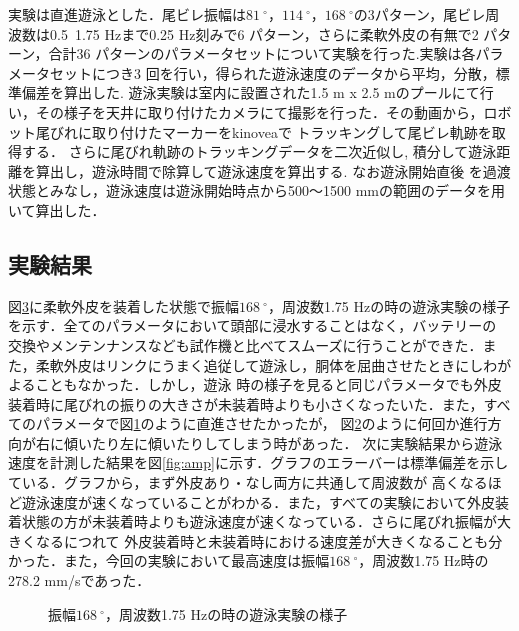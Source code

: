 実験は直進遊泳とした．尾ビレ振幅は$81\:^\circ$，$114\:^\circ$，$168\:^\circ$の3パターン，尾ビレ周波数は0.5~1.75 Hzまで0.25 Hz刻みで6 パターン，さらに柔軟外皮の有無で2 パターン，合計36 
パターンのパラメータセットについて実験を行った.実験は各パラメータセットにつき3 回を行い，得られた遊泳速度のデータから平均，分散，標準偏差を算出した.
遊泳実験は室内に設置された1.5 m x 2.5 mのプールにて行い，その様子を天井に取り付けたカメラにて撮影を行った．その動画から，ロボット尾びれに取り付けたマーカーをkinoveaで
トラッキングして尾ビレ軌跡を取得する．
さらに尾びれ軌跡のトラッキングデータを二次近似し, 積分して遊泳距離を算出し，遊泳時間で除算して遊泳速度を算出する. なお遊泳開始直後
を過渡状態とみなし，遊泳速度は遊泳開始時点から500～1500 mmの範囲のデータを用いて算出した．

\subsection{実験結果}
図\ref{fig:test_swim}に柔軟外皮を装着した状態で振幅$168\:^\circ$，周波数1.75 Hzの時の遊泳実験の様子を示す．全てのパラメータにおいて頭部に浸水することはなく，バッテリーの
交換やメンテンナンスなども試作機と比べてスムーズに行うことができた．また，柔軟外皮はリンクにうまく追従して遊泳し，胴体を屈曲させたときにしわがよることもなかった．しかし，遊泳
時の様子を見ると同じパラメータでも外皮装着時に尾びれの振りの大きさが未装着時よりも小さくなったいた．また，すべてのパラメータで図\ref{fig:str}のように直進させたかったが，
図\ref{fig:right}のように何回か進行方向が右に傾いたり左に傾いたりしてしまう時があった．
次に実験結果から遊泳速度を計測した結果を図\ref{fig:amp}に示す．グラフのエラーバーは標準偏差を示している．グラフから，まず外皮あり・なし両方に共通して周波数が
高くなるほど遊泳速度が速くなっていることがわかる．また，すべての実験において外皮装着状態の方が未装着時よりも遊泳速度が速くなっている．さらに尾びれ振幅が大きくなるにつれて
外皮装着時と未装着時における速度差が大きくなることも分かった．また，今回の実験において最高速度は振幅$168\:^\circ$，周波数1.75 Hz時の278.2 mm/sであった．

\begin{figure}[hb]
   \centering  
   \begin{subfigure}[b]{1\linewidth}
       \centering
       \label{fig:str}
   \end{subfigure}
   \begin{subfigure}[b]{1\linewidth}
       \centering
       \label{fig:right}
   \end{subfigure}
   \caption{振幅$168\:^\circ$，周波数1.75 Hzの時の遊泳実験の様子}
   \label{fig:test_swim}
\end{figure}

